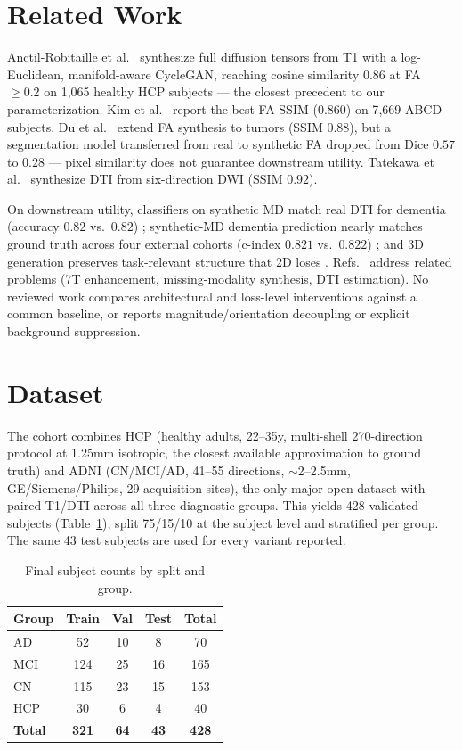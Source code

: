 \documentclass[conference,compsoc]{IEEEtran}
\begin{document}
\section{Related Work}
\label{sec:related_work}
Anctil-Robitaille et al.\ \cite{paper1} synthesize full diffusion tensors from T1 with a log-Euclidean, manifold-aware CycleGAN, reaching cosine similarity $0.86$ at FA~$\geq0.2$ on 1{,}065 healthy HCP subjects --- the closest precedent to our parameterization. Kim et al.\ \cite{paper10} report the best FA SSIM ($0.860$) on 7{,}669 ABCD subjects. Du et al.\ \cite{paper7} extend FA synthesis to tumors (SSIM $0.88$), but a segmentation model transferred from real to synthetic FA dropped from Dice $0.57$ to $0.28$ --- pixel similarity does not guarantee downstream utility. Tatekawa et al.\ \cite{paper3} synthesize DTI from six-direction DWI (SSIM $0.92$).

On downstream utility, classifiers on synthetic MD match real DTI for dementia (accuracy $0.82$ vs.\ $0.82$) \cite{paper2}; synthetic-MD dementia prediction nearly matches ground truth across four external cohorts (c-index $0.821$ vs.\ $0.822$) \cite{paper6}; and 3D generation preserves task-relevant structure that 2D loses \cite{paper4}. Refs.~\cite{paper5,paper8,paper9} address related problems (7T enhancement, missing-modality synthesis, DTI estimation). No reviewed work compares architectural and loss-level interventions against a common baseline, or reports magnitude/orientation decoupling or explicit background suppression.

\section{Dataset}
\label{sec:dataset}
The cohort combines HCP (healthy adults, 22--35y, multi-shell 270-direction protocol at 1.25mm isotropic, the closest available approximation to ground truth) and ADNI (CN/MCI/AD, 41--55 directions, $\sim$2--2.5mm, GE/Siemens/Philips, 29 acquisition sites), the only major open dataset with paired T1/DTI across all three diagnostic groups. This yields 428 validated subjects (Table~\ref{tab:dataset}), split 75/15/10 at the subject level and stratified per group. The same 43 test subjects are used for every variant reported.

\begin{table}[t]
\centering
\small
\caption{Final subject counts by split and group.}
\label{tab:dataset}
\begin{tabular}{lcccc}
\toprule
\textbf{Group} & \textbf{Train} & \textbf{Val} & \textbf{Test} & \textbf{Total} \\
\midrule
AD  & 52  & 10 & 8  & 70 \\
MCI & 124 & 25 & 16 & 165 \\
CN  & 115 & 23 & 15 & 153 \\
HCP & 30  & 6  & 4  & 40 \\
\midrule
\textbf{Total} & \textbf{321} & \textbf{64} & \textbf{43} & \textbf{428} \\
\bottomrule
\end{tabular}
\end{table}
\end{document}
